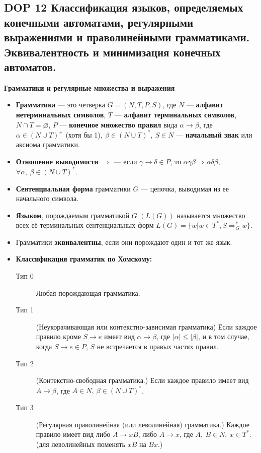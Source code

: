 \subsection{DOP 12 Классификация  языков,  определяемых  конечными  автоматами,  регулярными  выражениями  и праволинейными грамматиками. Эквивалентность и минимизация конечных автоматов.}

\textbf{Грамматики и регулярные множества и выражения}
\begin{itemize}
    \item \textbf{Грамматика} --- это четверка $G = (N, T, P, S)$, где $N$ --- \textbf{алфавит нетерминальных символов}, $T$ --- \textbf{алфавит терминальных символов}, $N \cap T = \varnothing$, $P$ --- \textbf{конечное множество правил} вида $\alpha \rightarrow \beta$, где $\alpha \in (N \cup T)^+$ (хотя бы 1)$,~\beta \in (N \cup T)^\ast,~S \in N$ --- \textbf{начальный знак} или аксиома грамматики.
    \item \textbf{Отношение выводимости} $\Rightarrow$ --- если $\gamma \rightarrow \delta \in P$, то $\alpha \gamma \beta \Rightarrow \alpha \delta \beta$, $\forall \alpha,~\beta \in (N \cup T)^\ast$.
    \item \textbf{Сентенциальная форма} грамматики $G$ --- цепочка, выводимая из ее начального символа.
    \item \textbf{Языком}, порождаемым грамматикой $G$ $(L(G))$ называется множество всех её терминальных сентенциальных форм $L(G) = \{ w |w \in T^\ast , S \Rightarrow^{\ast}_G w\}$.
    \item Грамматики \textbf{эквивалентны}, если они порождают один и тот же язык.
    \item \textbf{Классификация грамматик по Хомскому:}
    \begin{description}
        \item[Тип 0] Любая порождающая грамматика.
        \item[Тип 1] (Неукорачивающая или контекстно-зависимая грамматика) Если каждое правило кроме $S \rightarrow e$ имеет вид $\alpha \rightarrow \beta$, где $|\alpha| \leqslant |\beta|$, и в том случае, когда $S \rightarrow e \in P$, $S$ не встречается в правых частях правил.
        \item[Тип 2] (Контекстно-свободная грамматика.) Если каждое правило имеет вид $A \rightarrow \beta$, где $A \in N,~\beta \in (N \cup T)^\ast$.
        \item[Тип 3] (Регулярная праволинейная (или леволинейная) грамматика.) Каждое правило имеет вид либо $A \rightarrow xB$, либо $A \rightarrow x$, где $A,~B \in N,~x \in T^\ast$. (для леволинейных поменять $xB$ на $Bx$.)

\end{description}
\end{itemize}

